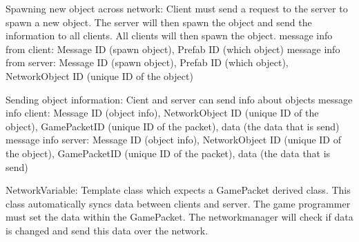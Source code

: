 Spawning new object across network:
Client must send a request to the server to spawn a new object. The server will then spawn the object and send the information to all clients. All clients will then spawn the object.
message info from client: Message ID (spawn object), Prefab ID (which object)
message info from server: Message ID (spawn object), Prefab ID (which object), NetworkObject ID (unique ID of the object)

Sending object information:
Cient and server can send info about objects
message info client: Message ID (object info), NetworkObject ID (unique ID of the object), GamePacketID (unique ID of the packet), data (the data that is send)
message info server: Message ID (object info), NetworkObject ID (unique ID of the object), GamePacketID (unique ID of the packet), data (the data that is send)

NetworkVariable:
Template class which expects a GamePacket derived class. This class automatically syncs data between clients and server. The game programmer must set the data within the GamePacket. The networkmanager will check if data is changed and send this data over the network.
